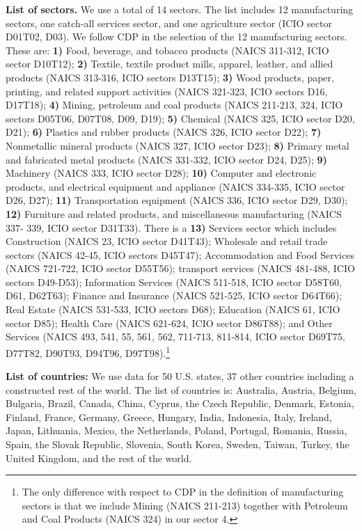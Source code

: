 \documentclass[12pt]{article}
\begin{document}
\textbf{List of sectors.} We use a total of 14 sectors. The list includes 12 manufacturing sectors, one catch-all services sector, and one agriculture sector (ICIO sector D01T02, D03). We follow CDP in the selection of the 12 manufacturing sectors. These are: \textbf{1)} Food, beverage, and tobacco products (NAICS 311-312, ICIO sector D10T12); \textbf{2)} Textile, textile product mills, apparel, leather, and allied products (NAICS 313-316, ICIO sectors D13T15); \textbf{3)} Wood products, paper, printing, and related support activities (NAICS 321-323, ICIO sectors D16, D17T18); \textbf{4)} Mining, petroleum and coal products (NAICS 211-213, 324, ICIO sectors D05T06, D07T08, D09, D19); \textbf{5)} Chemical (NAICS 325, ICIO sector D20, D21); \textbf{6)} Plastics and rubber products (NAICS 326, ICIO sector D22); \textbf{7)} Nonmetallic mineral products (NAICS 327, ICIO sector D23); \textbf{8)} Primary metal and fabricated metal products (NAICS 331-332, ICIO sector D24, D25); \textbf{9)} Machinery (NAICS 333, ICIO sector D28); \textbf{10)} Computer and electronic products, and electrical equipment and appliance (NAICS 334-335, ICIO sector D26, D27); \textbf{11)} Transportation equipment (NAICS 336, ICIO sector D29, D30); \textbf{12)} Furniture and related products, and miscellaneous manufacturing (NAICS 337- 339, ICIO sector D31T33). There is a \textbf{13)} Services sector which includes Construction (NAICS 23, ICIO sector D41T43); Wholesale and retail trade sectors (NAICS 42-45, ICIO sectors D45T47); Accommodation and Food Services (NAICS 721-722, ICIO sector D55T56); transport services (NAICS 481-488, ICIO sectors D49-D53); Information Services (NAICS 511-518, ICIO sector D58T60, D61, D62T63); Finance and Insurance (NAICS 521-525, ICIO sector D64T66); Real Estate (NAICS 531-533, ICIO sectors D68); Education (NAICS 61, ICIO sector D85); Health Care (NAICS 621-624, ICIO sector D86T88); and  Other Services (NAICS 493, 541, 55, 561, 562, 711-713, 811-814, ICIO sector D69T75, D77T82, D90T93, D94T96, D97T98).\footnote{The only difference with respect to CDP in the definition of manufacturing sectors is that we include Mining (NAICS 211-213) together with Petroleum and Coal Products (NAICS 324) in our sector 4.}

\textbf{List of countries:} We use data for 50 U.S. states, 37 other countries including a constructed rest of the world. The list of countries is: Australia, Austria, Belgium, Bulgaria, Brazil, Canada, China, Cyprus, the Czech Republic, Denmark, Estonia, Finland, France, Germany, Greece, Hungary, India, Indonesia, Italy, Ireland, Japan, Lithuania,
Mexico, the Netherlands, Poland, Portugal, Romania, Russia, Spain, the Slovak Republic, Slovenia, South Korea, Sweden, Taiwan, Turkey, the United Kingdom, and the rest of the world.
\end{document}
